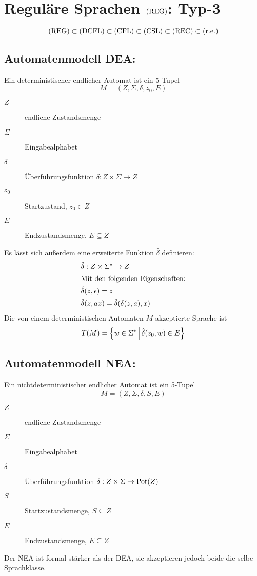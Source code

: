 \chapter{Reguläre Sprachen $\mathrm{(REG)}$: Typ-3}
\begin{equation*}
	\mathrm{(REG)}\subset\mathrm{(DCFL)}\subset\mathrm{(CFL)}\subset\mathrm{(CSL)}\subset\mathrm{(REC)}\subset\mathrm{(r.e.)}
\end{equation*}

\section{Automatenmodell DEA:}
Ein deterministischer endlicher Automat ist ein 5-Tupel
\begin{equation*}
	M=(Z,\Sigma,\delta,z_0,E)
\end{equation*}
\begin{description}
	\item[$Z$] endliche Zustandsmenge
	\item[$\Sigma$] Eingabealphabet
	\item[$\delta$] Überführungsfunktion $\delta:Z\times\Sigma\rightarrow Z$
	\item[$z_0$] Startzustand, $z_0\in Z$
	\item[$E$] Endzustandsmenge, $E\subseteq Z$
\end{description}
\bigskip
Es lässt sich außerdem eine erweiterte Funktion $\hat\delta$ definieren:
\begin{align*}
	&\hat\delta:Z\times\Sigma^\star\rightarrow Z\\
	\intertext{Mit den folgenden Eigenschaften:}
	&\hat\delta(z,\epsilon)=z\\
	&\hat\delta(z,ax)=\hat\delta(\delta(z,a),x)
\end{align*}
Die von einem deterministischen Automaten $M$ akzeptierte Sprache ist
\begin{equation*}
	T(M)=\left\{ w\in\Sigma^\star \,\middle|\, \hat\delta(z_0,w)\in E \right\}
\end{equation*}

\section{Automatenmodell NEA:}\label{reg:nea}
Ein nichtdeterministischer endlicher Automat ist ein 5-Tupel
\begin{equation*}
	M=(Z,\Sigma,\delta,S,E)
\end{equation*}
\begin{description}
	\item[$Z$] endliche Zustandsmenge
	\item[$\Sigma$] Eingabealphabet
	\item[$\delta$] Überführungsfunktion $\delta:Z\times\Sigma\rightarrow \mathrm{Pot}(Z)$
	\item[$S$] Startzustandsmenge, $S\subseteq Z$
	\item[$E$] Endzustandsmenge, $E\subseteq Z$
\end{description}
Der NEA ist formal stärker als der DEA, sie akzeptieren jedoch beide die selbe Sprachklasse.


